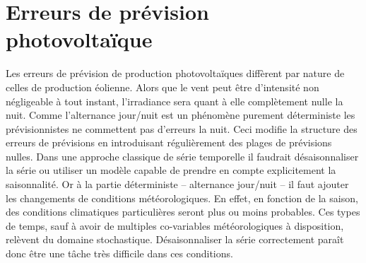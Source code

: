 \documentclass[12pt, french]{report}
\begin{document}
\chapter{Erreurs de prévision photovoltaïque}
\label{chap:PV}
Les erreurs de prévision de production photovoltaïques diffèrent par nature de celles de production éolienne. Alors que le vent peut être d'intensité non négligeable à tout instant, l'irradiance sera quant à elle complètement nulle la nuit. Comme l'alternance jour/nuit est un phénomène purement déterministe les prévisionnistes ne commettent pas d'erreurs la nuit. Ceci modifie la structure des erreurs de prévisions en introduisant régulièrement des plages de prévisions nulles. Dans une approche classique de série temporelle il faudrait désaisonnaliser la série ou utiliser un modèle capable de prendre en compte explicitement la saisonnalité. Or à la partie déterministe -- alternance jour/nuit -- il faut ajouter les changements de conditions météorologiques. En effet, en fonction de la saison, des conditions climatiques particulières seront plus ou moins probables. Ces types de temps, sauf à avoir de multiples co-variables météorologiques à disposition, relèvent du domaine stochastique. Désaisonnaliser la série correctement paraît donc être une tâche très difficile dans ces conditions.


\end{document}
